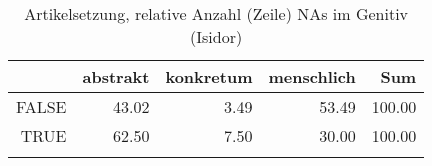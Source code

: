 \begin{table}[ht]
\centering
\begin{tabular}{rrrrr}
  \lsptoprule
 & abstrakt & konkretum & menschlich & Sum \\ 
  \midrule
FALSE & 43.02 & 3.49 & 53.49 & 100.00 \\ 
  TRUE & 62.50 & 7.50 & 30.00 & 100.00 \\ 
   \lspbottomrule
\end{tabular}
\caption{Artikelsetzung, relative Anzahl (Zeile) NAs im Genitiv (Isidor)} 
\end{table}
